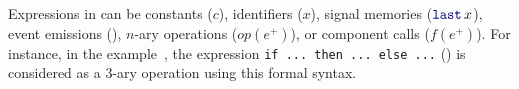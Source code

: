 %
Expressions in \GRSync can be constants ($c$), identifiers ($x$), signal memories ($\last{x}$),
event emissions (), $n$-ary operations ($op(e^+)$), or component calls ($f(e^+)$).
%
For instance, in the example~, the expression
\verb|if ... then ... else ...| () is considered as a $3$-ary operation using
this formal syntax.
